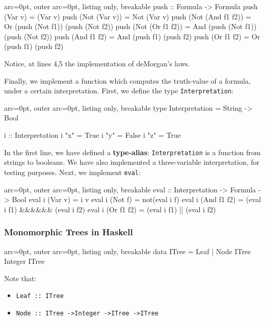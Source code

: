 \begin{tcblisting}{ arc=0pt, outer arc=0pt, listing only, breakable}
push :: Formula -> Formula
push (Var v) = (Var v)
push (Not (Var v)) = Not (Var v)
push (Not (And f1 f2)) = Or (push (Not f1)) (push (Not f2))
push (Not (Or f1 f2)) = And (push (Not f1)) (push (Not f2))
push (And f1 f2) = And (push f1) (push f2)
push (Or f1 f2) = Or (push f1) (push f2)

\end{tcblisting}


Notice, at lines 4,5 the implementation of deMorgan's laws.

Finally, we implement a function which computes the truth-value of a formula, under a certain interpretation. First, we define the type \texttt{Interpretation}:

\begin{tcblisting}{ arc=0pt, outer arc=0pt, listing only, breakable}
type Interpretation = String -> Bool

i :: Interpretation
i "x" = True
i "y" = False
i "z" = True

\end{tcblisting}
 

In the first line, we have defined a \textbf{type-alias}: \texttt{Interpretation} is a function from strings to booleans. We have also implemented a three-variable interpretation, for testing purposes. Next, we implement \texttt{eval}:


\begin{tcblisting}{ arc=0pt, outer arc=0pt, listing only, breakable}
eval :: Interpretation -> Formula -> Bool
eval i (Var v) = i v
eval i (Not f) = not(eval i f)
eval i (And f1 f2) = (eval i f1) &\&&&\&& (eval i f2)
eval i (Or f1 f2) = (eval i f1) || (eval i f2)

\end{tcblisting}


\subsubsection*{ Monomorphic Trees in Haskell }


\begin{tcblisting}{ arc=0pt, outer arc=0pt, listing only, breakable}
data ITree = Leaf | Node ITree Integer ITree

\end{tcblisting}


Note that:
\begin{itemize}
	\item  \texttt{Leaf :: ITree}
	\item  \texttt{Node :: ITree -\textgreater  Integer -\textgreater  ITree -\textgreater  ITree}
\end{itemize}

